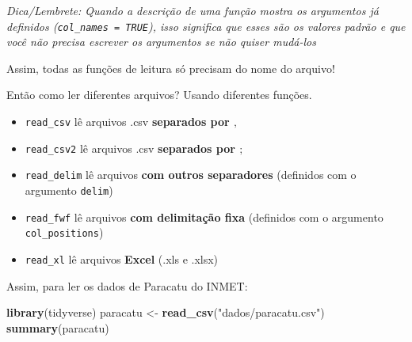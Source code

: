 \documentclass[]{book}
\newenvironment{Shaded}{\begin{snugshade}}{\end{snugshade}}
\newcommand{\KeywordTok}[1]{\textcolor[rgb]{0.13,0.29,0.53}{\textbf{#1}}}
\newcommand{\StringTok}[1]{\textcolor[rgb]{0.31,0.60,0.02}{#1}}
\newcommand{\NormalTok}[1]{#1}
\providecommand{\tightlist}{%
  \setlength{\itemsep}{0pt}\setlength{\parskip}{0pt}}
\theoremstyle{definition}
\theoremstyle{definition}
\theoremstyle{definition}
\theoremstyle{remark}
\begin{document}
\emph{Dica/Lembrete: Quando a descrição de uma função mostra os
argumentos já definidos (\texttt{col\_names\ =\ TRUE}), isso significa
que esses são os valores padrão e que você não precisa escrever os
argumentos se não quiser mudá-los}

Assim, todas as funções de leitura só precisam do nome do arquivo!

Então como ler diferentes arquivos? Usando diferentes funções.

\begin{itemize}
\tightlist
\item
  \texttt{read\_csv} lê arquivos .csv \textbf{separados por \(,\)}\\
\item
  \texttt{read\_csv2} lê arquivos .csv \textbf{separados por \(;\)}\\
\item
  \texttt{read\_delim} lê arquivos \textbf{com outros separadores}
  (definidos com o argumento \texttt{delim})\\
\item
  \texttt{read\_fwf} lê arquivos \textbf{com delimitação fixa}
  (definidos com o argumento \texttt{col\_positions})\\
\item
  \texttt{read\_xl} lê arquivos \textbf{Excel} (.xls e .xlsx)
\end{itemize}

Assim, para ler os dados de Paracatu do INMET:

\begin{Shaded}
\begin{Highlighting}[]
\KeywordTok{library}\NormalTok{(tidyverse)}
\NormalTok{paracatu <-}\StringTok{ }\KeywordTok{read_csv}\NormalTok{(}\StringTok{"dados/paracatu.csv"}\NormalTok{)}
\KeywordTok{summary}\NormalTok{(paracatu)}
\end{Highlighting}
\end{Shaded}
\end{document}
